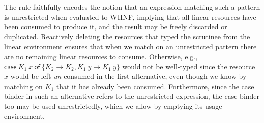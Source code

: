 \documentclass[acmsmall,review,anonymous,screen]{acmart}
\newcommand{\ccase}[2]{\mathsf{case}~#1~\mathsf{of}~#2}
\begin{document}
%
The rule faithfully encodes the notion that an expression matching such a
pattern is unrestricted when evaluated to WHNF, implying that all linear
resources have been consumed to produce it, and the result may 
be freely discarded or duplicated.
%
Reactively deleting the resources that typed the scrutinee from the linear
environment ensures that when we match on an unrestricted pattern there are no
remaining linear resources to consume. Otherwise, e.g., $\ccase{K_1~x}{\{K_2 \to
K_2,K_1~y \to K_1~y\}}$ would not be well-typed since the resource $x$ would
be left \emph{un}-consumed in the first alternative, even though we know by
matching on $K_1$ that it has already been consumed.
%
Furthermore, since the case binder in such an alternative refers to the
unrestricted expression, the case binder too may be used unrestrictedly, which
we allow by emptying its usage environment.


\end{document}
